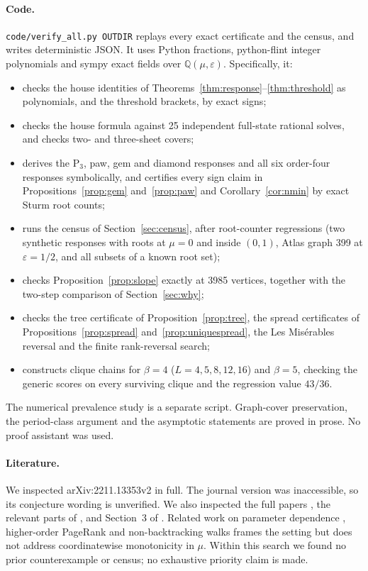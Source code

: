 \documentclass[11pt,a4paper]{article}
\theoremstyle{definition}\newtheorem{conjecture}{Conjecture}
\theoremstyle{remark}\newtheorem{remark}[theorem]{Remark}
\newcommand{\eps}{\varepsilon}
\begin{document}
\paragraph{Code.} \texttt{code/verify\_all.py OUTDIR} replays every exact certificate and the census, and writes deterministic JSON. It uses Python fractions, python-flint integer polynomials and sympy exact fields over $\mathbb Q(\mu,\eps)$. Specifically, it:
\begin{itemize}
 \item checks the house identities of Theorems~\ref{thm:response}--\ref{thm:threshold} as polynomials, and the threshold brackets, by exact signs;
 \item checks the house formula against 25 independent full-state rational solves, and checks two- and three-sheet covers;
 \item derives the P$_3$, paw, gem and diamond responses and all six order-four responses symbolically, and certifies every sign claim in Propositions~\ref{prop:gem} and~\ref{prop:paw} and Corollary~\ref{cor:nmin} by exact Sturm root counts;
 \item runs the census of Section~\ref{sec:census}, after root-counter regressions (two synthetic responses with roots at $\mu=0$ and inside $(0,1)$, Atlas graph 399 at $\eps=1/2$, and all subsets of a known root set);
 \item checks Proposition~\ref{prop:slope} exactly at 3985 vertices, together with the two-step comparison of Section~\ref{sec:why};
 \item checks the tree certificate of Proposition~\ref{prop:tree}, the spread certificates of Propositions~\ref{prop:spread} and~\ref{prop:uniquespread}, the Les Mis\'erables reversal and the finite rank-reversal search;
 \item constructs clique chains for $\beta=4$ ($L=4,5,8,12,16$) and $\beta=5$, checking the generic scores on every surviving clique and the regression value $43/36$.
\end{itemize}
The numerical prevalence study is a separate script. Graph-cover preservation, the period-class argument and the asymptotic statements are proved in prose. No proof assistant was used.

\paragraph{Literature.} We inspected arXiv:2211.13353v2 \cite{gloverarxiv} in full. The journal version \cite{glover} was inaccessible, so its conjecture wording is unverified. We also inspected the full papers \cite{aleja,arrigo}, the relevant parts of \cite{criado,meng,avena}, and Section~3 of \cite{henning}. Related work on parameter dependence \cite{boldidamp,gleichsurvey}, higher-order PageRank \cite{gleichlimyu,benson} and non-backtracking walks \cite{hashimoto,alon,kempton} frames the setting but does not address coordinatewise monotonicity in $\mu$. Within this search we found no prior counterexample or census; no exhaustive priority claim is made.
\end{document}
